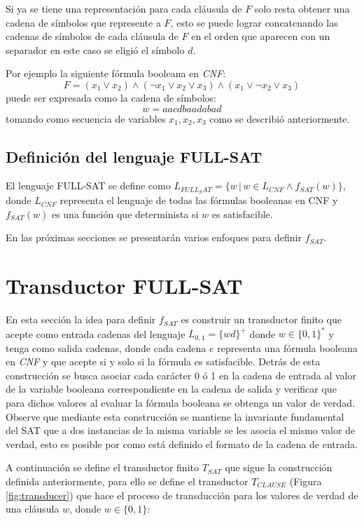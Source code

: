 \documentclass{article}
\begin{document}
Si ya se tiene una representación para cada cláusula de $F$ solo resta obtener una cadena de símbolos que represente a $F$,
esto se puede lograr concatenando las cadenas de símbolos de cada cláusula de $F$ en el orden que aparecen con un separador
en este caso se eligió el símbolo $d$.

Por ejemplo la siguiente fórmula booleana en \textit{CNF}:
$$F=(x_1 \vee x_2) \wedge (\neg x_1 \vee x_2 \vee x_3) \wedge (x_1 \vee \neg x_2 \vee x_3)$$
puede ser expresada como la cadena de símbolos:
$$w=aacdbaadabad$$
tomando como secuencia de variables $x_1, x_2, x_3$ como se describió anteriormente.

\subsection{Definición del lenguaje FULL-SAT}

El lenguaje FULL-SAT se define como $L_{FULL_SAT}=\{w\,|\,w \in L_{CNF} \wedge f_{SAT}(w)\}$, donde $L_{CNF}$ representa el lenguaje
de todas las fórmulas booleanas en CNF y $f_{SAT}(w)$ es una función que determinista si $w$ es satisfacible.

En las próximas secciones se presentarán varios enfoques para definir $f_{SAT}$.

\section{Transductor FULL-SAT}

En esta sección la idea para definir $f_{SAT}$ es construir un transductor finito que acepte como entrada cadenas del lenguaje $L_{0,1}=\{wd\}^+$ donde $w\in \{0,1\}^*$
y tenga como salida cadenas, donde cada cadena $e$ representa una fórmula booleana en \textit{CNF} y que acepte si y solo si la fórmula es satisfacible. Detrás
de esta construcción se busca asociar cada carácter 0 ó 1 en la cadena de entrada al valor de la variable booleana correspondiente en la cadena de salida y verificar que para dichos
valores al evaluar la fórmula booleana se obtenga un valor de verdad. Observe que mediante esta construcción se mantiene la invariante fundamental del SAT que a dos instancias
de la misma variable se les asocia el mismo valor de verdad, esto es posible por como está definido el formato de la cadena de entrada.

A continuación se define el transductor finito $T_{SAT}$ que sigue la construcción definida anteriormente, para ello se define
el transductor $T_{CLAUSE}$ (Figura \ref{fig:transducer}) que hace el proceso de transducción para los valores de verdad de una cláusula $w$, donde $w\in \{0,1\}$:
\end{document}
